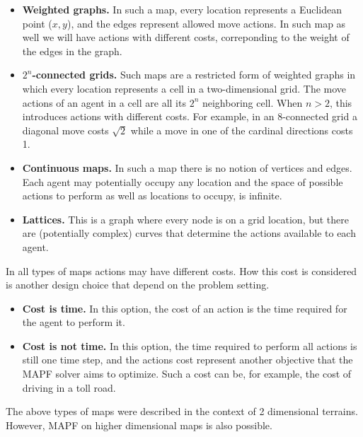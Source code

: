 \begin{itemize}
\item \textbf{Weighted graphs.} In such a map, every location represents a Euclidean point ($x,y$), and the edges represent allowed move actions. In such map as well we will have actions with different costs, correponding to the weight of the edges in the graph.
\item \textbf{$2^n$-connected grids.} Such maps are a restricted form of weighted graphs in which every location represents a cell in a two-dimensional grid. The move actions of an agent in a cell are all its $2^n$ neighboring cell. When $n>2$, this introduces actions with different costs. For example, in an 8-connected grid a diagonal move costs $\sqrt{2}$ while a move in one of the cardinal directions costs 1. 
\item \textbf{Continuous maps.} In such a map there is no notion of vertices and edges. Each agent may potentially occupy any location and the space of possible actions to perform as well as locations to occupy, is infinite.
\item \textbf{Lattices.} This is a graph where every node is on a grid location, but there are (potentially complex) curves that determine the actions available to each agent.

\end{itemize}
In all types of maps actions may have different costs. 
How this cost is considered is another design choice that depend on the problem setting. 
\begin{itemize}
	\item \textbf{Cost is time.} In this option, the cost of an action is the time required for the agent to perform it. 
    \item \textbf{Cost is not time.} In this option, the time required to perform all actions is still one time step, and the actions cost represent another objective that the MAPF solver aims to optimize. Such a cost can be, for example, the cost of driving in a toll road. 
\end{itemize}

The above types of maps were described in the context of 2 dimensional terrains. However, MAPF on higher dimensional maps is also possible. 





